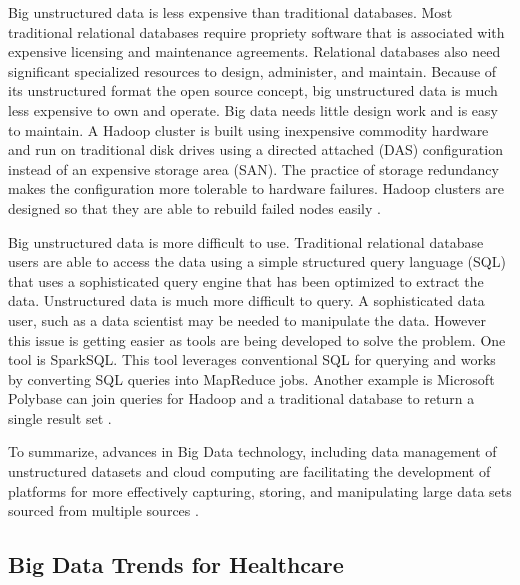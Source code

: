 \documentclass[sigconf]{acmart}
\begin{document}
Big unstructured data is less expensive than traditional databases. Most traditional relational databases require propriety software that is associated with expensive licensing and maintenance agreements.  Relational databases also need significant specialized resources to design, administer, and maintain. Because of its unstructured format the open source concept, big unstructured data is much less expensive to own and operate. Big data needs little design work and is easy to maintain. A Hadoop cluster is built using inexpensive commodity hardware and run on traditional disk drives using a directed attached (DAS) configuration instead of an expensive storage area (SAN).  The practice of storage redundancy makes the configuration more tolerable to hardware failures.  Hadoop clusters are designed so that they are able to rebuild failed nodes easily \cite{www-google-HlthCat}.  

Big unstructured data is more difficult to use.  Traditional relational database users are able to access the data using a simple structured query language (SQL) that uses a sophisticated query engine that has been optimized to extract the data.  Unstructured data is much more difficult to query. A sophisticated data user, such as a data scientist may be needed to manipulate the data. However this issue is getting easier as tools are being developed to solve the problem. One tool is SparkSQL.  This tool leverages conventional SQL for querying and works by converting SQL queries into MapReduce jobs.  Another example is Microsoft Polybase can join queries for Hadoop and a traditional database to return a single result set \cite{www-google-HlthCat}. 

To summarize, advances in Big Data technology, including data management of unstructured datasets and cloud computing are facilitating the development of platforms for more effectively capturing, storing, and manipulating large data sets sourced from multiple sources \cite{springer}.  

\subsection{Big Data Trends for Healthcare}
\end{document}
